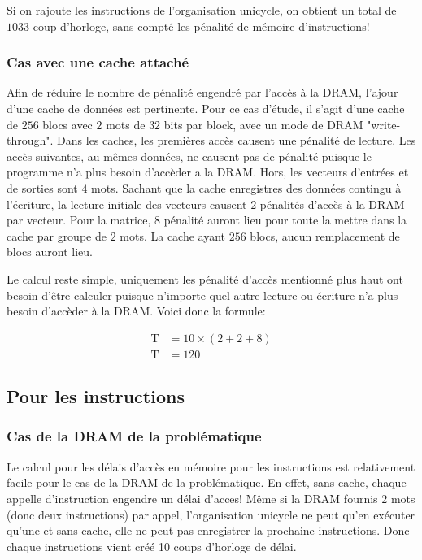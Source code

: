 \documentclass[a11paper]{article}
\begin{document}
Si on rajoute les instructions de l'organisation unicycle, on obtient un
total de $1033$ coup d'horloge, sans compté les pénalité de mémoire
d'instructions!

\subsubsection{Cas avec une cache attaché}

Afin de réduire le nombre de pénalité engendré par l'accès à la DRAM, l'ajour
d'une cache de données est pertinente. Pour ce cas d'étude, il s'agit d'une
cache de $256$ blocs avec $2$ mots de $32$ bits par block, avec un mode de
DRAM "write-through". Dans les caches, les premières accès causent une
pénalité de lecture. Les accès suivantes, au mêmes données, ne causent pas de
pénalité puisque le programme n'a plus besoin d'accèder a la DRAM. Hors, les
vecteurs d'entrées et de sorties sont $4$ mots. Sachant que la cache
enregistres des données contingu à l'écriture, la lecture initiale des
vecteurs causent $2$ pénalités d'accès à la DRAM par vecteur. Pour la
matrice, $8$ pénalité auront lieu pour toute la mettre dans la cache par
groupe de $2$ mots. La cache ayant $256$ blocs, aucun remplacement de blocs
auront lieu.

Le calcul reste simple, uniquement les pénalité d'accès mentionné plus haut
ont besoin d'être calculer puisque n'importe quel autre lecture ou écriture
n'a plus besoin d'accèder à la DRAM. Voici donc la formule:

\begin{align}
  \text{T} &= 10\times(2+2+8) \\
  \text{T} &= 120
\end{align}


\subsection{Pour les instructions}
\subsubsection{Cas de la DRAM de la problématique}
Le calcul pour les délais d'accès en mémoire pour les instructions est relativement facile pour le cas de la DRAM de la problématique. En effet, sans cache, chaque
appelle d'instruction engendre un délai d'acces! Même si la DRAM fournis $2$ mots (donc deux instructions) par appel, l'organisation unicycle ne peut qu'en exécuter
qu'une et sans cache, elle ne peut pas enregistrer la prochaine instructions. Donc chaque instructions vient créé 10 coups d'horloge de délai.
\end{document}
